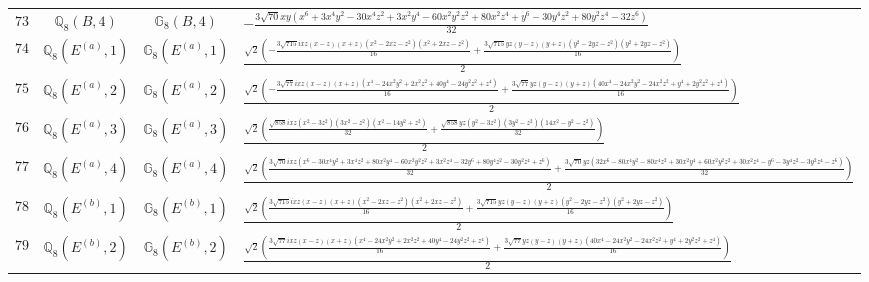 \documentclass[fleqn,8pt,landscape]{jsarticle}
\begin{document}
\begin{table}[ht!]
\begin{center}
\begin{tabular}{cccl}
$ 73 $ & $ \mathbb{Q}_{8}(B,4) $ & $ \mathbb{G}_{8}(B,4) $ & $ - \frac{3 \sqrt{70} x y \left(x^{6} + 3 x^{4} y^{2} - 30 x^{4} z^{2} + 3 x^{2} y^{4} - 60 x^{2} y^{2} z^{2} + 80 x^{2} z^{4} + y^{6} - 30 y^{4} z^{2} + 80 y^{2} z^{4} - 32 z^{6}\right)}{32} $ \\
$ 74 $ & $ \mathbb{Q}_{8}(E^{(a)},1) $ & $ \mathbb{G}_{8}(E^{(a)},1) $ & $ \frac{\sqrt{2} \left(- \frac{3 \sqrt{715} i x z \left(x - z\right) \left(x + z\right) \left(x^{2} - 2 x z - z^{2}\right) \left(x^{2} + 2 x z - z^{2}\right)}{16} + \frac{3 \sqrt{715} y z \left(y - z\right) \left(y + z\right) \left(y^{2} - 2 y z - z^{2}\right) \left(y^{2} + 2 y z - z^{2}\right)}{16}\right)}{2} $ \\
$ 75 $ & $ \mathbb{Q}_{8}(E^{(a)},2) $ & $ \mathbb{G}_{8}(E^{(a)},2) $ & $ \frac{\sqrt{2} \left(- \frac{3 \sqrt{77} i x z \left(x - z\right) \left(x + z\right) \left(x^{4} - 24 x^{2} y^{2} + 2 x^{2} z^{2} + 40 y^{4} - 24 y^{2} z^{2} + z^{4}\right)}{16} + \frac{3 \sqrt{77} y z \left(y - z\right) \left(y + z\right) \left(40 x^{4} - 24 x^{2} y^{2} - 24 x^{2} z^{2} + y^{4} + 2 y^{2} z^{2} + z^{4}\right)}{16}\right)}{2} $ \\
$ 76 $ & $ \mathbb{Q}_{8}(E^{(a)},3) $ & $ \mathbb{G}_{8}(E^{(a)},3) $ & $ \frac{\sqrt{2} \left(\frac{\sqrt{858} i x z \left(x^{2} - 3 z^{2}\right) \left(3 x^{2} - z^{2}\right) \left(x^{2} - 14 y^{2} + z^{2}\right)}{32} + \frac{\sqrt{858} y z \left(y^{2} - 3 z^{2}\right) \left(3 y^{2} - z^{2}\right) \left(14 x^{2} - y^{2} - z^{2}\right)}{32}\right)}{2} $ \\
$ 77 $ & $ \mathbb{Q}_{8}(E^{(a)},4) $ & $ \mathbb{G}_{8}(E^{(a)},4) $ & $ \frac{\sqrt{2} \left(\frac{3 \sqrt{70} i x z \left(x^{6} - 30 x^{4} y^{2} + 3 x^{4} z^{2} + 80 x^{2} y^{4} - 60 x^{2} y^{2} z^{2} + 3 x^{2} z^{4} - 32 y^{6} + 80 y^{4} z^{2} - 30 y^{2} z^{4} + z^{6}\right)}{32} + \frac{3 \sqrt{70} y z \left(32 x^{6} - 80 x^{4} y^{2} - 80 x^{4} z^{2} + 30 x^{2} y^{4} + 60 x^{2} y^{2} z^{2} + 30 x^{2} z^{4} - y^{6} - 3 y^{4} z^{2} - 3 y^{2} z^{4} - z^{6}\right)}{32}\right)}{2} $ \\
$ 78 $ & $ \mathbb{Q}_{8}(E^{(b)},1) $ & $ \mathbb{G}_{8}(E^{(b)},1) $ & $ \frac{\sqrt{2} \left(\frac{3 \sqrt{715} i x z \left(x - z\right) \left(x + z\right) \left(x^{2} - 2 x z - z^{2}\right) \left(x^{2} + 2 x z - z^{2}\right)}{16} + \frac{3 \sqrt{715} y z \left(y - z\right) \left(y + z\right) \left(y^{2} - 2 y z - z^{2}\right) \left(y^{2} + 2 y z - z^{2}\right)}{16}\right)}{2} $ \\
$ 79 $ & $ \mathbb{Q}_{8}(E^{(b)},2) $ & $ \mathbb{G}_{8}(E^{(b)},2) $ & $ \frac{\sqrt{2} \left(\frac{3 \sqrt{77} i x z \left(x - z\right) \left(x + z\right) \left(x^{4} - 24 x^{2} y^{2} + 2 x^{2} z^{2} + 40 y^{4} - 24 y^{2} z^{2} + z^{4}\right)}{16} + \frac{3 \sqrt{77} y z \left(y - z\right) \left(y + z\right) \left(40 x^{4} - 24 x^{2} y^{2} - 24 x^{2} z^{2} + y^{4} + 2 y^{2} z^{2} + z^{4}\right)}{16}\right)}{2} $ \\

\end{tabular}
\end{center}
\end{table}
\end{document}
